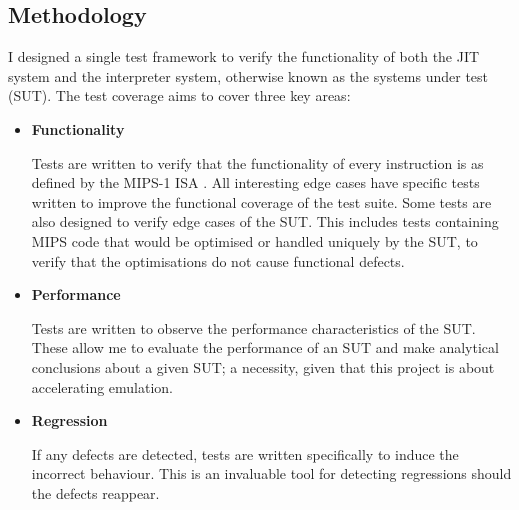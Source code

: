\subsection{Methodology}

I designed a single test framework to verify the functionality of both the JIT system and the interpreter system, otherwise known as the systems under test (SUT). The test coverage aims to cover three key areas:

\begin{itemize}
    \item \textbf{Functionality}
    
    Tests are written to verify that the functionality of every instruction is as defined by the MIPS-1 ISA \cite{mips-1-isa}. All interesting edge cases have specific tests written to improve the functional coverage of the test suite. Some tests are also designed to verify edge cases of the SUT. This includes tests containing MIPS code that would be optimised or handled uniquely by the SUT, to verify that the optimisations do not cause functional defects.
    
    \item \textbf{Performance}
    
    Tests are written to observe the performance characteristics of the SUT. These allow me to evaluate the performance of an SUT and make analytical conclusions about a given SUT; a necessity, given that this project is about accelerating emulation.
    
    \item \textbf{Regression}
    
    If any defects are detected, tests are written specifically to induce the incorrect behaviour. This is an invaluable tool for detecting regressions should the defects reappear.
\end{itemize}